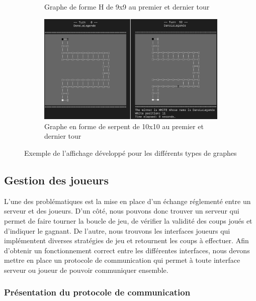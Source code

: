 \documentclass[11pt]{article}
\begin{document}
\begin{figure}[H]
\begin{subfigure}{.48\textwidth}
        \caption{Graphe de forme H de 9x9 au premier et dernier tour}
        \label{fig:display-h}
        \hfill
    \end{subfigure}
    \hfill
    \begin{subfigure}{.48\textwidth}
        \centering
        \includegraphics[width=\linewidth, height=.6\linewidth]{display-s.png}
        \caption{Graphe en forme de serpent de 10x10 au premier et dernier tour}
        \label{fig:display-s}
        \hfill
    \end{subfigure}
    \caption{Exemple de l'affichage développé pour les différents types de graphes}
\end{figure}

\subsection{Gestion des joueurs}\label{sec:player-management}

L'une des problématiques est la mise en place d'un échange réglementé entre un serveur et des joueurs. D'un côté, nous pouvons donc trouver un serveur qui permet de faire tourner la boucle de jeu, de vérifier la validité des coups joués et d'indiquer le gagnant. De l'autre, nous trouvons les interfaces joueurs qui implémentent diverses stratégies de jeu et retournent les coups à effectuer. Afin d'obtenir un fonctionnement correct entre les différentes interfaces, nous devons mettre en place un protocole de communication qui permet à toute interface serveur ou joueur de pouvoir communiquer ensemble.

\subsubsection{Présentation du protocole de communication}
\end{document}
